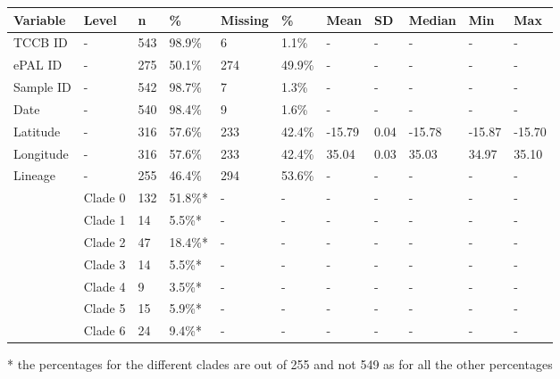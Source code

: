 \begin{spacing}{0.8}
    \begin{small}
         \label{tab:mcet-data-summary}
        \begin{longtable}{p{0.61in}p{0.5in}R{0.25in}R{0.35in}R{0.4in}R{0.31in}R{0.4in}R{0.2in}R{0.4in}R{0.3in}R{0.3in}}
            \toprule
            Variable  & Level   & n   & \%      & Missing & \%     & Mean   & SD   & Median & Min    & Max    \\
            \midrule
            TCCB ID   & -       & 543 & 98.9\%  & 6       & 1.1\%  & -      & -    & -      & -      & -      \\
            ePAL ID   & -       & 275 & 50.1\%  & 274     & 49.9\% & -      & -    & -      & -      & -      \\
            Sample ID & -       & 542 & 98.7\%  & 7       & 1.3\%  & -      & -    & -      & -      & -      \\
            Date      & -       & 540 & 98.4\%  & 9       & 1.6\%  & -      & -    & -      & -      & -      \\
            Latitude  & -       & 316 & 57.6\%  & 233     & 42.4\% & -15.79 & 0.04 & -15.78 & -15.87 & -15.70 \\
            Longitude & -       & 316 & 57.6\%  & 233     & 42.4\% & 35.04  & 0.03 & 35.03  & 34.97  & 35.10  \\
            Lineage   & -       & 255 & 46.4\%  & 294     & 53.6\% & -      & -    & -      & -      & -      \\
            & Clade 0 & 132 & 51.8\%* & -       & -      & -      & -    & -      & -      & -      \\
            & Clade 1 & 14  & 5.5\%*  & -       & -      & -      & -    & -      & -      & -      \\
            & Clade 2 & 47  & 18.4\%* & -       & -      & -      & -    & -      & -      & -      \\
            & Clade 3 & 14  & 5.5\%*  & -       & -      & -      & -    & -      & -      & -      \\
            & Clade 4 & 9   & 3.5\%*  & -       & -      & -      & -    & -      & -      & -      \\
            & Clade 5 & 15  & 5.9\%*  & -       & -      & -      & -    & -      & -      & -      \\
            & Clade 6 & 24  & 9.4\%*  & -       & -      & -      & -    & -      & -      & -      \\
            \bottomrule

        \end{longtable}
        * the percentages for the different clades are out of 255 and not 549 as for all the other percentages
    \end{small}
\end{spacing}


